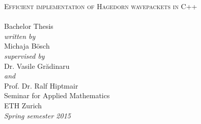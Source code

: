 \begin{titlepage}
\begin{center}
  \hfill
  \vspace{3.0cm}

  {\huge \textsc{Efficient implementation of Hagedorn wavepackets in C++\\[10pt]
  }}
  ~\\[20pt]

  {\huge{Bachelor Thesis}}\\[2.5cm]

  {\emph{written by}}\\
  Michaja Bösch
  \\[0.6cm]
  {\emph{supervised by}}\\
  Dr. Vasile Gr\u{a}dinaru\\
  {\emph{and}}\\
  Prof. Dr. Ralf Hiptmair
  \\[2.5cm]

  Seminar for Applied Mathematics\\
  ETH Zurich
  \\[0.5cm]
  \emph{{Spring semester 2015}}
\end{center}
\end{titlepage}
